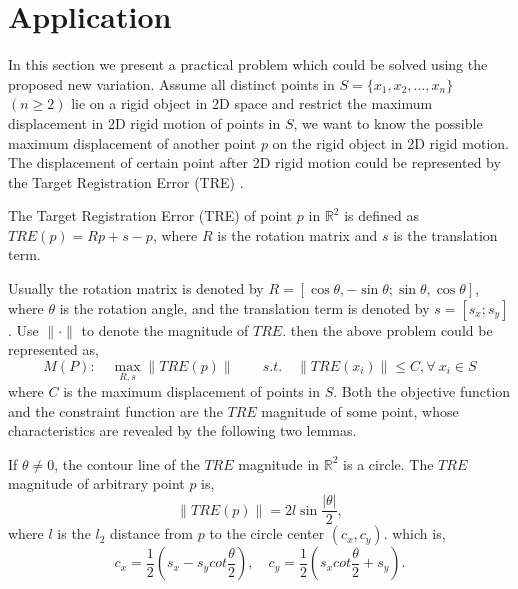 \documentclass[final,3p,times]{elsarticle}
\begin{document}
\section{Application}
In this section we present a practical problem which could be solved using the proposed new variation. Assume all distinct points in $S=\{x_1,x_2,...,x_n\}$ $(n\geq 2)$ lie on a rigid object in 2D space and restrict the maximum displacement in 2D rigid motion of points in $S$, we want to know the possible maximum displacement of another point $p$ on the rigid object in 2D rigid motion. The displacement of certain point after 2D rigid motion could be represented by the Target Registration Error (TRE) \cite{Fitzpatrick1998}.
\begin{defn}
The Target Registration Error (TRE) of point $p$ in $\mathbb{R}^2$ is defined as $TRE(p)=Rp+s-p$, where $R$ is the rotation matrix and $s$ is the translation term.
\end{defn}
Usually the rotation matrix is denoted by $R=[\cos\theta, -\sin\theta; \sin\theta, \cos\theta]$, where $\theta$ is the rotation angle, and the translation term is denoted by $s=[s_x;s_y]$. Use $\|\cdot\|$ to denote the magnitude of $TRE$. then the above problem could be represented as,
\begin{equation}
\label{eq_perturbation}
M(P):\quad \max_{R,s} \|TRE(p)\| \qquad  s.t.\quad \|TRE(x_i)\|\leq C, \forall\ x_i\in S
\end{equation}
where $C$ is the maximum displacement of points in $S$. Both the objective function and the constraint function are the $TRE$ magnitude of some point, whose characteristics are revealed by the following two lemmas.
\begin{Lemma}
\label{lemma_contourline}
If $\theta\neq 0$, the contour line of the $TRE$ magnitude in $\mathbb{R}^2$ is a circle. The $TRE$ magnitude of arbitrary point $p$ is,
\begin{equation}
\|TRE(p)\|=2l\sin\frac{|\theta|}{2},
\end{equation}
where $l$ is the $l_2$ distance from $p$ to the circle center $(c_x,c_y)$.
 which is,
\begin{equation}
\label{eq_circle}
c_x = \frac{1}{2}(s_x - s_ycot\frac{\theta}{2}), \quad c_y = \frac{1}{2}(s_xcot\frac{\theta}{2}+s_y).
\end{equation}
\end{Lemma}
\end{document}
